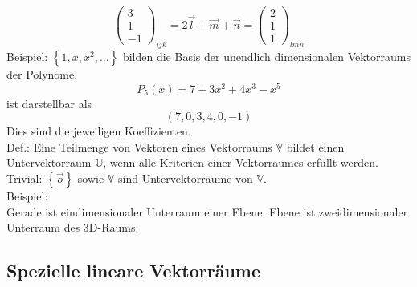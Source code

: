 \documentclass{article}
\begin{document}
\begin{equation*}
    \left(\begin{array}{c}
        3 \\ 1 \\ -1
    \end{array}\right)_{ijk} = 2 \vec{l} + \vec{m} + \vec{n} = \left(\begin{array}{c}
        2 \\ 1 \\ 1
    \end{array}\right)_{lmn} 
\end{equation*}
Beispiel: $\left\{1,x,x^2,\dots\right\}$ bilden die Basis der unendlich dimensionalen Vektorraums der Polynome.\
\begin{equation*}
    P_5\left(x\right)=7+3x^2+4x^3-x^5
\end{equation*}
ist darstellbar als
\begin{equation*}
    \left(7,0,3,4,0,-1\right)
\end{equation*}
Dies sind die jeweiligen Koeffizienten.\\
Def.: Eine Teilmenge von Vektoren eines Vektorraums $\mathbb{V}$ bildet einen Untervektorraum $\mathbb{U}$, wenn alle Kriterien einer Vektorraumes erfüllt werden.\\
Trivial: $\left\{\vec{o}\right\}$ sowie $\mathbb{V}$ sind Untervektorräume von $\mathbb{V}$.\\
Beispiel:\\
Gerade ist eindimensionaler Unterraum einer Ebene.
Ebene ist zweidimensionaler Unterraum des 3D-Raums.
\subsection{Spezielle lineare Vektorräume}
\end{document}
